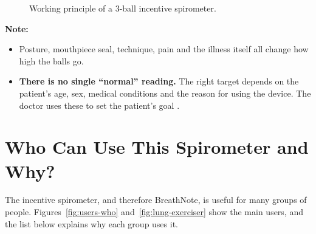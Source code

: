 \documentclass[12pt,a4paper]{article}
\begin{document}
\begin{figure}[H]
\centering
{}
\caption{Working principle of a 3-ball incentive spirometer.}
\label{fig:principle}
\end{figure}

\textbf{Note:}
\begin{itemize}
  \item Posture, mouthpiece seal, technique, pain and the illness itself all change how high the balls go.
  \item \textbf{There is no single ``normal'' reading.} The right target depends on the patient's age, sex, medical conditions and the reason for using the device. The doctor uses these to set the patient's goal \cite{verywell}.
\end{itemize}

\section{Who Can Use This Spirometer and Why?}
\label{sec:users}

The incentive spirometer, and therefore BreathNote, is useful for many groups of people. Figures~\ref{fig:users-who} and~\ref{fig:lung-exerciser} show the main users, and the list below explains why each group uses it.
\end{document}
